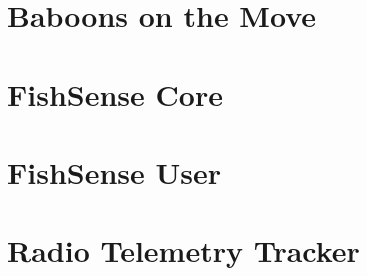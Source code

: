 \section{Baboons on the Move}

\section{FishSense Core}

\section{FishSense User}

\section{Radio Telemetry Tracker}

